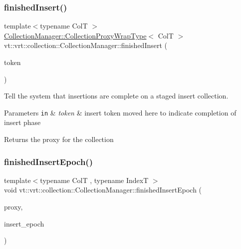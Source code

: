 \subsubsection{\texorpdfstring{finished\+Insert()}{finishedInsert()}}
{\footnotesize\ttfamily template$<$typename ColT $>$ \\
\hyperlink{structvt_1_1vrt_1_1collection_1_1_collection_manager_a56458ed7f9bb22b631b9b3a745f42f94}{Collection\+Manager\+::\+Collection\+Proxy\+Wrap\+Type}$<$ ColT $>$ vt\+::vrt\+::collection\+::\+Collection\+Manager\+::finished\+Insert (\begin{DoxyParamCaption}\item[{\hyperlink{structvt_1_1vrt_1_1collection_1_1_insert_token}{Insert\+Token}$<$ ColT $>$ \&\&}]{token }\end{DoxyParamCaption})}



Tell the system that insertions are complete on a staged insert collection. 


\begin{DoxyParams}[1]{Parameters}
\mbox{\tt in}  & {\em token} & insert token moved here to indicate completion of insert phase\\
\hline
\end{DoxyParams}
\begin{DoxyReturn}{Returns}
the proxy for the collection 
\end{DoxyReturn}
\mbox{\label{structvt_1_1vrt_1_1collection_1_1_collection_manager_ac59dd2227839839776c92ca0c23934e5}} 
\subsubsection{\texorpdfstring{finished\+Insert\+Epoch()}{finishedInsertEpoch()}}
{\footnotesize\ttfamily template$<$typename ColT , typename IndexT $>$ \\
void vt\+::vrt\+::collection\+::\+Collection\+Manager\+::finished\+Insert\+Epoch (\begin{DoxyParamCaption}\item[{\hyperlink{structvt_1_1vrt_1_1collection_1_1_collection_manager_a56458ed7f9bb22b631b9b3a745f42f94}{Collection\+Proxy\+Wrap\+Type}$<$ ColT, IndexT $>$ const \&}]{proxy,  }\item[{\hyperlink{namespacevt_a985a5adf291c34a3ca263b3378388236}{Epoch\+Type} const \&}]{insert\+\_\+epoch }\end{DoxyParamCaption})\hspace{0.3cm}{\ttfamily [private]}}



